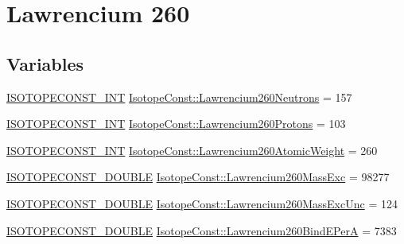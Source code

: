 \hypertarget{group___isotope_const-_lawrencium-_lr260}{}\section{Lawrencium 260}
\label{group___isotope_const-_lawrencium-_lr260}
\subsection*{Variables}
\begin{DoxyCompactItemize}
\item 
\mbox{\hyperlink{group___isotope_const-_macros_ga5f18360b3e99483a35c32d789e62621c}{I\+S\+O\+T\+O\+P\+E\+C\+O\+N\+S\+T\+\_\+\+I\+NT}} \mbox{\hyperlink{group___isotope_const-_lawrencium-_lr260_gab98bfbe6275934728b2b0b0590a2321a}{Isotope\+Const\+::\+Lawrencium260\+Neutrons}} = 157
\item 
\mbox{\hyperlink{group___isotope_const-_macros_ga5f18360b3e99483a35c32d789e62621c}{I\+S\+O\+T\+O\+P\+E\+C\+O\+N\+S\+T\+\_\+\+I\+NT}} \mbox{\hyperlink{group___isotope_const-_lawrencium-_lr260_ga33b15a2951f3c505e53ce0dfd9f61d4f}{Isotope\+Const\+::\+Lawrencium260\+Protons}} = 103
\item 
\mbox{\hyperlink{group___isotope_const-_macros_ga5f18360b3e99483a35c32d789e62621c}{I\+S\+O\+T\+O\+P\+E\+C\+O\+N\+S\+T\+\_\+\+I\+NT}} \mbox{\hyperlink{group___isotope_const-_lawrencium-_lr260_ga568c0a44c8a895d2e43dea474a0484a3}{Isotope\+Const\+::\+Lawrencium260\+Atomic\+Weight}} = 260
\item 
\mbox{\hyperlink{group___isotope_const-_macros_ga8f45a7272ce02c0b4c65c44636ed719a}{I\+S\+O\+T\+O\+P\+E\+C\+O\+N\+S\+T\+\_\+\+D\+O\+U\+B\+LE}} \mbox{\hyperlink{group___isotope_const-_lawrencium-_lr260_gabddc8222963b4bf3935952dcf52ce866}{Isotope\+Const\+::\+Lawrencium260\+Mass\+Exc}} = 98277
\item 
\mbox{\hyperlink{group___isotope_const-_macros_ga8f45a7272ce02c0b4c65c44636ed719a}{I\+S\+O\+T\+O\+P\+E\+C\+O\+N\+S\+T\+\_\+\+D\+O\+U\+B\+LE}} \mbox{\hyperlink{group___isotope_const-_lawrencium-_lr260_ga9e1c8773ed88042d84b1f57262b6fa31}{Isotope\+Const\+::\+Lawrencium260\+Mass\+Exc\+Unc}} = 124
\item 
\mbox{\hyperlink{group___isotope_const-_macros_ga8f45a7272ce02c0b4c65c44636ed719a}{I\+S\+O\+T\+O\+P\+E\+C\+O\+N\+S\+T\+\_\+\+D\+O\+U\+B\+LE}} \mbox{\hyperlink{group___isotope_const-_lawrencium-_lr260_gacf35b8212b25666239449785fdbf97b6}{Isotope\+Const\+::\+Lawrencium260\+Bind\+E\+PerA}} = 7383
\item 

\end{DoxyCompactItemize}
